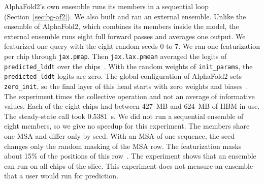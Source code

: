 AlphaFold2's own ensemble runs its members in a sequential loop (Section~\ref{sec:bg-af2}).
We also built and ran an external ensemble.
Unlike the ensemble of AlphaFold2, which combines its members inside the model, the external ensemble runs
eight full forward passes and averages one output.
We featurized one query with the eight random seeds 0 to 7. We ran one featurization per chip through \texttt{jax.pmap}. %
Then \texttt{jax.lax.pmean} averaged the logits of \texttt{predicted\_lddt} over the chips~\cite{jaxpmean}. With the
random weights of \texttt{init\_params}, the \texttt{predicted\_lddt} logits are zero.
 The global configuration of AlphaFold2 sets
\texttt{zero\_init}, so the final layer of this head starts with zero weights and biases~\cite{alphafoldrepo}. The
experiment times the collective operation and not an average of informative values.
Each of the eight chips had between 427~MB and 624~MB of HBM in use. %
The steady-state call took 0.5381~s. %
We did not run a sequential ensemble of eight members, so we give no speedup for this experiment. The members share one
MSA and differ only by seed.
With an MSA of one sequence, the seed changes only the random masking of the MSA row. The featurization masks about 15\% of the positions of this row~\cite{alphafoldrepo}. %
The experiment shows that an ensemble can run on all chips of the slice. This experiment does not measure an ensemble
that a user would run for prediction.

